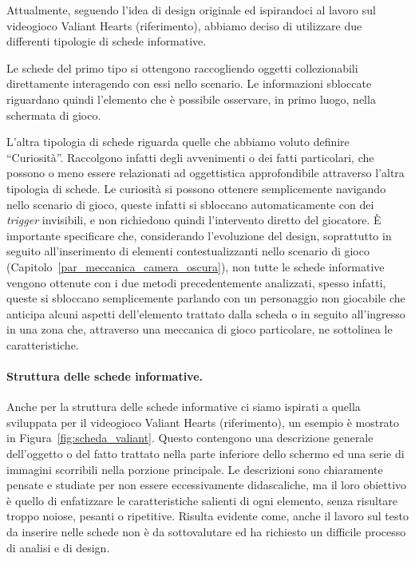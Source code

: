 Attualmente, seguendo l’idea di design originale ed ispirandoci al lavoro sul videogioco Valiant Hearts (riferimento), abbiamo deciso di utilizzare due differenti tipologie di schede informative.

Le schede del primo tipo si ottengono raccogliendo oggetti collezionabili direttamente interagendo con essi nello scenario. Le informazioni sbloccate riguardano quindi l’elemento che è possibile osservare, in primo luogo, nella schermata di gioco. 

L’altra tipologia di schede riguarda quelle che abbiamo voluto definire “Curiosità”. Raccolgono infatti degli avvenimenti o dei fatti particolari, che possono o meno essere relazionati ad oggettistica approfondibile attraverso l’altra tipologia di schede. Le curiosità si possono ottenere semplicemente navigando nello scenario di gioco, queste infatti si sbloccano automaticamente con dei \textit{trigger} invisibili, e non richiedono quindi l’intervento diretto del giocatore.
È importante specificare che, considerando l’evoluzione del design, soprattutto in seguito all’inserimento di elementi contestualizzanti nello scenario di gioco (Capitolo~\ref{par_meccanica_camera_oscura}), non tutte le schede informative vengono ottenute con i due metodi precedentemente analizzati, spesso infatti, queste si sbloccano semplicemente parlando con un personaggio non giocabile che anticipa alcuni aspetti dell’elemento trattato dalla scheda o in seguito all’ingresso in una zona che, attraverso una meccanica di gioco particolare, ne sottolinea le caratteristiche.

\paragraph{Struttura delle schede informative.}
\label{par:struttura_schede}

Anche per la struttura delle schede informative ci siamo ispirati a quella sviluppata per il videogioco Valiant Hearts (riferimento), un esempio è mostrato in Figura~\ref{fig:scheda_valiant}. Questo contengono una descrizione generale dell’oggetto o del fatto trattato nella parte inferiore dello schermo ed una serie di immagini scorribili nella porzione principale.
Le descrizioni sono chiaramente pensate e studiate per non essere eccessivamente didascaliche, ma il loro obiettivo è quello di enfatizzare le caratteristiche salienti di ogni elemento, senza risultare troppo noiose, pesanti o ripetitive. Risulta evidente come, anche il lavoro sul testo da inserire nelle schede non è da sottovalutare ed ha richiesto un difficile processo di analisi e di design.

